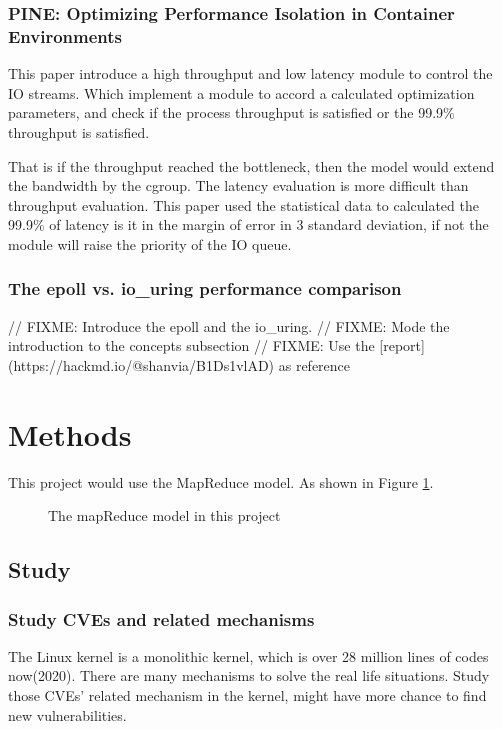 \documentclass[12pt,a4paper]{IEEEconf}
\begin{document}
\subsubsection{PINE: Optimizing Performance Isolation in Container Environments}
This paper\cite{Optimizing} introduce a high throughput and low latency module to control
the IO streams. Which implement a module to accord a calculated optimization parameters,
and check if the process throughput is satisfied or the 99.9\% throughput is satisfied.

That is if the throughput reached the bottleneck, then the model would extend the
bandwidth by the cgroup. The latency evaluation is more difficult than throughput
evaluation. This paper\cite{Optimizing} used the statistical data to calculated the
99.9\% of latency is it in the margin of error in 3 standard deviation, if not the
module will raise the priority of the IO queue.

\subsubsection{The epoll vs. io\_uring performance comparison}
// FIXME: Introduce the epoll and the io\_uring.
// FIXME: Mode the introduction to the concepts subsection
// FIXME: Use the [report](https://hackmd.io/@shanvia/B1Ds1vlAD) as reference


\section{Methods}
This project would use the MapReduce model. As shown in Figure \ref*{Fig:model}.

\begin{figure}
  \centering
  \caption[]{The mapReduce model in this project}
  \label{Fig:model}
\end{figure}

\subsection{Study}
\subsubsection{Study CVEs and related mechanisms}
The Linux kernel is a monolithic kernel, which is over 28 million lines of codes now(2020). There
are many mechanisms to solve the real life situations. Study those CVEs' related mechanism in the
kernel, might have more chance to find new vulnerabilities.
\end{document}
